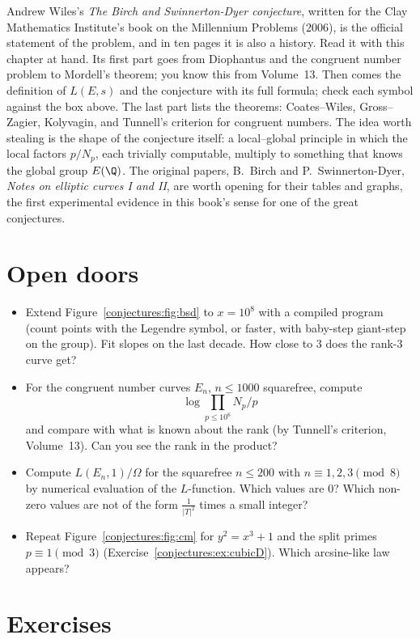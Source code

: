 Andrew Wiles's \emph{The Birch and Swinnerton-Dyer conjecture}, written for the Clay Mathematics Institute's book on the Millennium Problems (2006), is the
official statement of the problem, and in ten pages it is also a history. Read it with this chapter at hand. Its first part goes from Diophantus and the
congruent number problem to Mordell's theorem; you know this from Volume~13. Then comes the definition of $L(E,s)$ and the conjecture with its full formula; check
each symbol against the box above. The last part lists the theorems: Coates--Wiles, Gross--Zagier, Kolyvagin, and Tunnell's criterion for congruent numbers.
The idea worth stealing is the shape of the conjecture itself: a local--global principle in which the local factors $p/N_p$, each trivially computable,
multiply to something that knows the global group $E(\Q)$. The original papers, B.~Birch and P.~Swinnerton-Dyer, \emph{Notes on elliptic curves I and II},
are worth opening for their tables and graphs, the first experimental evidence in this book's sense for one of the great conjectures.

\section{Open doors}

\begin{itemize}
\item Extend Figure~\ref{conjectures:fig:bsd} to $x=10^8$ with a compiled program (count points with the Legendre symbol, or faster, with baby-step giant-step on the
group). Fit slopes on the last decade. How close to $3$ does the rank-$3$ curve get?
\item For the congruent number curves $E_n$, $n\le1000$ squarefree, compute
\[
\log\prod_{p\le10^6}N_p/p
\]
 and compare with what is known about the rank (by
Tunnell's criterion, Volume~13). Can you see the rank in the product?
\item Compute $L(E_n,1)/\Omega$ for the squarefree $n\le200$ with $n\equiv1,2,3\pmod8$ by numerical evaluation of the $L$-function. Which values are $0$? Which non-zero values
are not of the form $\frac1{|T|^2}$ times a small integer?
\item Repeat Figure~\ref{conjectures:fig:cm} for $y^2=x^3+1$ and the split primes $p\equiv1\pmod3$ (Exercise~\ref{conjectures:ex:cubicD}). Which arcsine-like law appears?
\end{itemize}

\section{Exercises}

